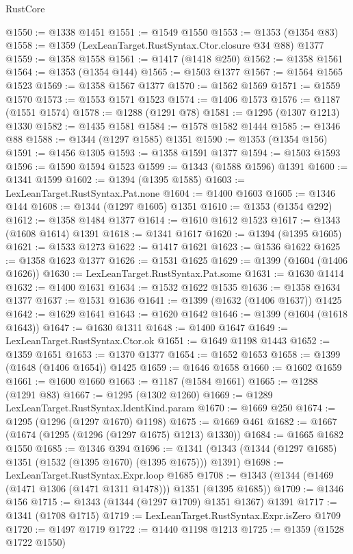 \begin{lexlean}{RustCore}
\begin{coremodule}
{\begin{coremodule}
{{{{{{{{{{{{{{{{{{{{{{{{{{{{{{{{{{{{{{{{{{{{@1550 := @1338 @1451
@1551 := @1549 @1550
@1553 := @1353 (@1354 @83)
@1558 := @1359 (LexLeanTarget.RustSyntax.Ctor.closure @34 @88) @1377
@1559 := @1358 @1558
@1561 := @1417 (@1418 @250)
@1562 := @1358 @1561
@1564 := @1353 (@1354 @144)
@1565 := @1503 @1377
@1567 := @1564 @1565 @1523
@1569 := @1358 @1567 @1377
@1570 := @1562 @1569
@1571 := @1559 @1570
@1573 := @1553 @1571 @1523
@1574 := @1406 @1573
@1576 := @1187 (@1551 @1574)
@1578 := @1288 (@1291 @78)
@1581 := @1295 (@1307 @1213) @1330
@1582 := @1435 @1581
@1584 := @1578 @1582 @1444
@1585 := @1346 @88
@1588 := @1344 (@1297 @1585) @1351
@1590 := @1353 (@1354 @156)
@1591 := @1456 @1305
@1593 := @1358 @1591 @1377
@1594 := @1503 @1593
@1596 := @1590 @1594 @1523
@1599 := @1343 (@1588 @1596) @1391
@1600 := @1341 @1599
@1602 := @1394 (@1395 @1585)
@1603 := LexLeanTarget.RustSyntax.Pat.none
@1604 := @1400 @1603
@1605 := @1346 @144
@1608 := @1344 (@1297 @1605) @1351
@1610 := @1353 (@1354 @292)
@1612 := @1358 @1484 @1377
@1614 := @1610 @1612 @1523
@1617 := @1343 (@1608 @1614) @1391
@1618 := @1341 @1617
@1620 := @1394 (@1395 @1605)
@1621 := @1533 @1273
@1622 := @1417 @1621
@1623 := @1536 @1622
@1625 := @1358 @1623 @1377
@1626 := @1531 @1625
@1629 := @1399 (@1604 (@1406 @1626))
@1630 := LexLeanTarget.RustSyntax.Pat.some
@1631 := @1630 @1414
@1632 := @1400 @1631
@1634 := @1532 @1622 @1535
@1636 := @1358 @1634 @1377
@1637 := @1531 @1636
@1641 := @1399 (@1632 (@1406 @1637)) @1425
@1642 := @1629 @1641
@1643 := @1620 @1642
@1646 := @1399 (@1604 (@1618 @1643))
@1647 := @1630 @1311
@1648 := @1400 @1647
@1649 := LexLeanTarget.RustSyntax.Ctor.ok
@1651 := @1649 @1198 @1443
@1652 := @1359 @1651
@1653 := @1370 @1377
@1654 := @1652 @1653
@1658 := @1399 (@1648 (@1406 @1654)) @1425
@1659 := @1646 @1658
@1660 := @1602 @1659
@1661 := @1600 @1660
@1663 := @1187 (@1584 @1661)
@1665 := @1288 (@1291 @83)
@1667 := @1295 (@1302 @1260)
@1669 := @1289 LexLeanTarget.RustSyntax.IdentKind.param
@1670 := @1669 @250
@1674 := @1295 (@1296 (@1297 @1670) @1198)
@1675 := @1669 @461
@1682 := @1667 (@1674 (@1295 (@1296 (@1297 @1675) @1213) @1330))
@1684 := @1665 @1682 @1550
@1685 := @1346 @394
@1696 := @1341 (@1343 (@1344 (@1297 @1685) @1351 (@1532 (@1395 @1670) (@1395 @1675))) @1391)
@1698 := LexLeanTarget.RustSyntax.Expr.loop @1685
@1708 := @1343 (@1344 (@1469 (@1471 @1306 (@1471 @1311 @1478))) @1351 (@1395 @1685))
@1709 := @1346 @156
@1715 := @1343 (@1344 (@1297 @1709) @1351 @1367) @1391
@1717 := @1341 (@1708 @1715)
@1719 := LexLeanTarget.RustSyntax.Expr.isZero @1709
@1720 := @1497 @1719
@1722 := @1440 @1198 @1213
@1725 := @1359 (@1528 @1722 @1550)
}}}}}}}}}}}}}}}}}}}}}}}}}}}}}}}}}}}}}}}}}}}}
\end{coremodule}}
\end{coremodule}
\end{lexlean}
